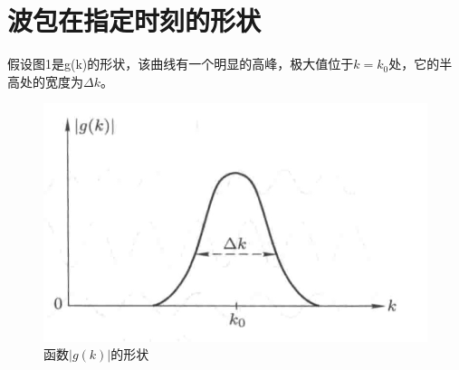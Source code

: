 \documentclass[]{article}
\begin{document}
\section{波包在指定时刻的形状}
假设图1是g(k)的形状，该曲线有一个明显的高峰，极大值位于$k=k_0$处，它的半高处的宽度为$\Delta k$。
\begin{figure}[H]
	\centering
	\includegraphics[scale=0.3]{1.png}
	\caption{函数$|g(k)|$的形状}
	\label{Figure 1}
\end{figure}
\end{document}
